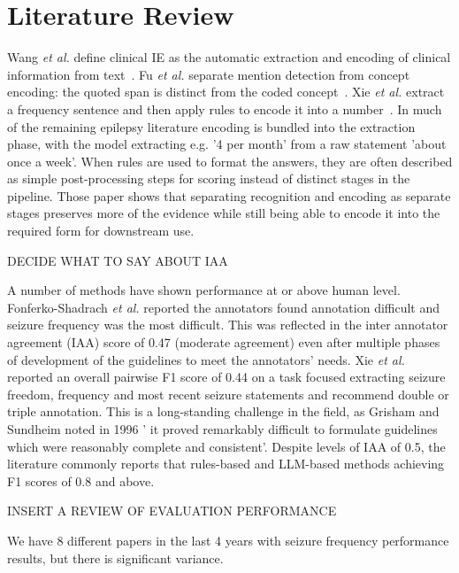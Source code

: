 \documentclass[conference]{IEEEtran}
\begin{document}
\section{Literature Review}

Wang \emph{et al.} define clinical IE as the automatic 
extraction and encoding of clinical information from 
text~\cite{b8}. Fu \emph{et al.} separate mention detection 
from concept encoding: the quoted span is distinct from
the coded concept~\cite{b6}. Xie \emph{et al.} extract a frequency 
sentence and then apply rules to encode it into a number~\cite{b9}. 
In much of the remaining epilepsy literature encoding is 
bundled into the extraction phase, with the model 
extracting e.g. '4 per month' from a raw statement 'about once 
a week'. When rules are used to format the answers, they are 
often described as simple post-processing steps for scoring 
instead of distinct stages in the pipeline. Those paper shows 
that separating recognition and encoding as separate stages 
preserves more of the evidence while still being able to 
encode it into the required form for downstream use.

DECIDE WHAT TO SAY ABOUT IAA

A number of methods have shown performance at 
or above human level. Fonferko-Shadrach \emph{et al.} 
reported the annotators found annotation difficult 
and seizure frequency was the most difficult. This was 
reflected in the inter annotator agreement (IAA) score
of 0.47 (moderate agreement) even after multiple phases 
of development of the guidelines to meet the annotators' 
needs.  Xie \emph{et al.} reported an overall pairwise F1
score of 0.44 on a task focused extracting seizure 
freedom, frequency and most recent seizure
statements and recommend double or triple annotation. 
This is a long-standing challenge in the field, as Grisham 
and Sundheim noted in 1996 ' it proved remarkably difficult
to formulate guidelines which were reasonably complete 
and consistent'. Despite levels of IAA of 0.5, the literature 
commonly reports that rules-based and LLM-based 
methods achieving F1 scores of 0.8 and above. 

INSERT A REVIEW OF EVALUATION PERFORMANCE

We have 8 different papers in the last 4 years with seizure frequency
performance results, but there is significant variance. 
\end{document}

